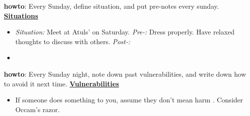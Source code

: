 \documentclass[11pt]{article}
\newcommand{\comments}[1]{}
\begin{document}
{            %
            \textbf{howto}: Every Sunday, define situation, and put pre-notes every sunday. \\
            \textbf{\small \underline{Situations}} \\ 
            \begin{itemize}
            \item \tiny \textit{Situation:} Meet at Atuls' on
              Saturday. \textit{Pre-:}  Dress properly. Have relaxed
              thoughts to discuss with others. \textit{Post-:} 
           \item \tiny 
            \end{itemize}
            \textbf{howto}: Every Sunday night, note down  past vulnerabilities, and write down how to avoid it next time.
            \textbf{\small \underline{Vulnerabilities}}\\
            \begin{itemize}
              \tiny \item \tiny If someone does something to you, assume they don't mean harm  . Consider Occam's razor. 
            \end{itemize}    
            \newpage              
            \comments{
              \noindent\begin{minipage}{\textwidth}
              \begin{minipage}[c][6cm][c]{\dimexpr0.5\textwidth-0.5\Colsep\relax}
                \lipsum[4]
              \end{minipage}\hfill
              \begin{minipage}[c][6cm][c]{\dimexpr0.5\textwidth-0.5\Colsep\relax}
                \lipsum[4]
              \end{minipage}%
              \end{minipage}
              \lipsum[4]
            }
            
}
\end{document}

